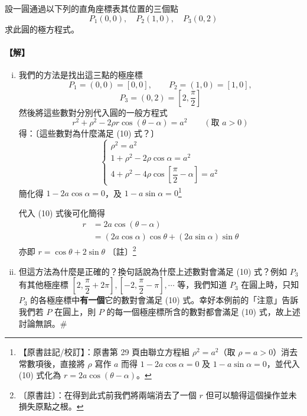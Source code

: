 \medskip
\begin{example}\label{ex:b5-1-3-3}
設一圓通過以下列的直角座標表其位置的三個點
\[
  P_1(0, 0), \quad P_2(1, 0), \quad P_3(0, 2)
\]
求此圓的極方程式。
\end{example}
\paragraph{【解】}
\begin{enumerate}[(i)]
  \item 我們的方法是找出這三點的極座標
  \[
    P_1 = (0, 0) = [0, 0], \qquad P_2 = (1, 0) = [1, 0],
  \]
  \[
    P_3 = (0, 2) = \left[2, \frac{\pi}{2}\right]
  \]
  然後將這些數對分別代入圓的一般方程式
  \begin{equation}\label{eq:b5-1-3-10}
    r^2 + \rho^2 - 2\rho r\cos(\theta - \alpha) = a^2 \qquad (\text{取 } a > 0) \tag{10}
  \end{equation}
  得：〔這些數對為什麼滿足 (10) 式？〕
  \[
    \begin{cases}
      \rho^2 = a^2 \\
      1 + \rho^2 - 2\rho\cos\alpha = a^2 \\
      4 + \rho^2 - 4\rho\cos\left[\dfrac{\pi}{2} - \alpha\right] = a^2
    \end{cases}
  \]
  簡化得 $1 - 2a\cos\alpha = 0$，及 $1 - a\sin\alpha = 0$\label{note:b5-ch1-p29-ex3}\footnote{【原書註記/校訂】：原書第 29 頁由聯立方程組 $\rho^2 = a^2$（取 $\rho = a > 0$）消去常數項後，直接將 $\rho$ 寫作 $a$ 而得 $1 - 2a\cos\alpha = 0$ 及 $1 - a\sin\alpha = 0$，並代入 (10) 式化為 $r = 2a\cos(\theta - \alpha)$。}

  代入 (10) 式後可化簡得
  \begin{align*}
    r &= 2a\cos(\theta - \alpha) \\
      &= (2a\cos\alpha)\cos\theta + (2a\sin\alpha)\sin\theta
  \end{align*}
  亦即 \qquad $r = \cos\theta + 2\sin\theta$ \qquad 〔註〕\footnote{〔原書註〕：在得到此式前我們將兩端消去了一個 $r$ 但可以驗得這個操作並未損失原點之根。}

  \item 但這方法為什麼是正確的？換句話說為什麼上述數對會滿足 (10) 式？例如 $P_3$ 有其他極座標 $\left[2, \dfrac{\pi}{2} + 2\pi\right], \left[-2, \dfrac{\pi}{2} - \pi\right], \cdots$ 等，我們知道 $P_3$ 在圓上時，只知 $P_3$ 的各極座標中\textbf{有一個}它的數對會滿足 (10) 式。幸好本例前的「注意」告訴我們若 $P$ 在圓上，則 $P$ 的每一個極座標所含的數對都會滿足 (10) 式，故上述討論無誤。\hfill$\#$
\end{enumerate}

